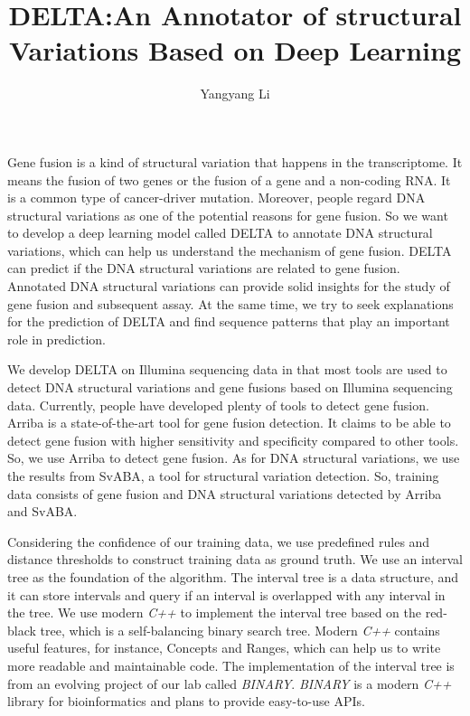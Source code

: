 \documentclass{article}
\title{DELTA:An Annotator of structural Variations Based on Deep Learning}
\author{Yangyang Li}
\begin{document}
\maketitle



Gene fusion is a kind of structural variation that happens in the transcriptome.
It means the fusion of two genes or the fusion of a gene and a non-coding RNA\@.
It is a common type of cancer-driver mutation.
Moreover, people regard DNA structural variations as one of the potential reasons for gene fusion.
So we want to develop a deep learning model called DELTA to annotate DNA structural variations, which can help us understand the mechanism of gene fusion.
DELTA can predict if the DNA structural variations are related to gene fusion.
Annotated DNA structural variations can provide solid insights for the study of gene fusion and subsequent assay.
At the same time, we try to seek explanations for the prediction of DELTA and find sequence patterns that play an important role in prediction.

We develop DELTA on Illumina sequencing data in that most tools are used to detect DNA structural variations and gene fusions based on Illumina sequencing data.
Currently, people have developed plenty of tools to detect gene fusion.
Arriba is a state-of-the-art tool for gene fusion detection.
It claims to be able to detect gene fusion with higher sensitivity and specificity compared to other tools.
So, we use Arriba to detect gene fusion.
As for DNA structural variations, we use the results from SvABA, a tool for structural variation detection.
So, training data consists of gene fusion and DNA structural variations detected by Arriba and SvABA\@.

Considering the confidence of our training data, we use predefined rules and distance thresholds to construct training data as ground truth.
We use an interval tree as the foundation of the algorithm.
The interval tree is a data structure, and it can store intervals and query if an interval is overlapped with any interval in the tree.
We use modern \textit{C++} to implement the interval tree based on the red-black tree, which is a self-balancing binary search tree.
Modern \textit{C++} contains useful features, for instance, Concepts and Ranges, which can help us to write more readable and maintainable code.
The implementation of the interval tree is from an evolving project of our lab called \textit{BINARY}.
\textit{BINARY} is a modern \textit{C++} library for bioinformatics and plans to provide easy-to-use APIs\@.
\end{document}
